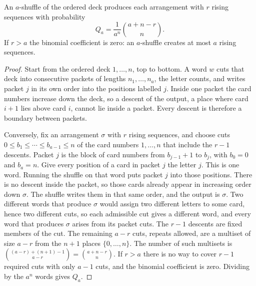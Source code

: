 \begin{theorem}\label{thm:bayerdiaconis}
An $a$-shuffle of the ordered deck produces each arrangement with $r$ rising sequences with probability
\[
 Q_a=\frac1{a^n}\binom{a+n-r}{n}.
\]
If $r>a$ the binomial coefficient is zero: an $a$-shuffle creates at most $a$ rising sequences.
\end{theorem}
\begin{proof}
Start from the ordered deck $1,\ldots,n$, top to bottom. A word $w$ cuts that deck into consecutive packets of lengths $n_1,\ldots,n_a$, the letter counts, and writes packet $j$ in its own order into the positions labelled $j$. Inside one packet the card numbers increase down the deck, so a descent of the output, a place where card $i+1$ lies above card $i$, cannot lie inside a packet. Every descent is therefore a boundary between packets.

Conversely, fix an arrangement $\sigma$ with $r$ rising sequences, and choose cuts $0\le b_1\le\cdots\le b_{a-1}\le n$ of the card numbers $1,\ldots,n$ that include the $r-1$ descents. Packet $j$ is the block of card numbers from $b_{j-1}+1$ to $b_j$, with $b_0=0$ and $b_a=n$. Give every position of a card in packet $j$ the letter $j$. This is one word. Running the shuffle on that word puts packet $j$ into those positions. There is no descent inside the packet, so those cards already appear in increasing order down $\sigma$. The shuffle writes them in that same order, and the output is $\sigma$. Two different words that produce $\sigma$ would assign two different letters to some card, hence two different cuts, so each admissible cut gives a different word, and every word that produces $\sigma$ arises from its packet cuts. The $r-1$ descents are fixed members of the cut. The remaining $a-r$ cuts, repeats allowed, are a multiset of size $a-r$ from the $n+1$ places $\{0,\ldots,n\}$. The number of such multisets is $\binom{(a-r)+(n+1)-1}{a-r}=\binom{a+n-r}{n}$. If $r>a$ there is no way to cover $r-1$ required cuts with only $a-1$ cuts, and the binomial coefficient is zero. Dividing by the $a^n$ words gives $Q_a$.
\end{proof}

